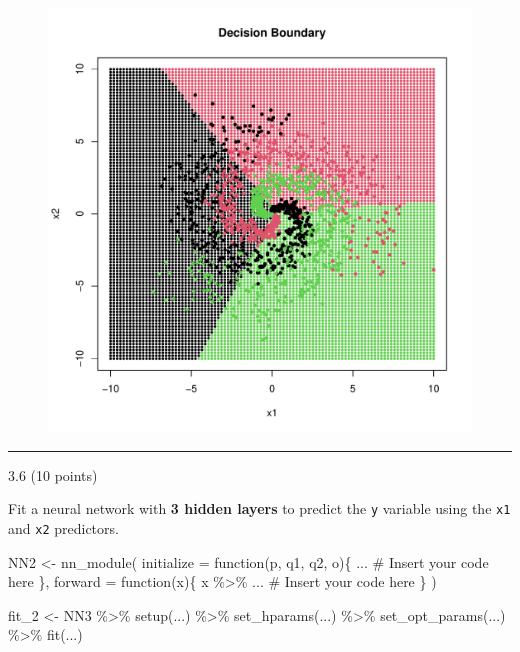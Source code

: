 \documentclass[
  letterpaper,
  DIV=11,
  numbers=noendperiod]{scrartcl}
\newenvironment{Shaded}{\begin{snugshade}}{\end{snugshade}}
\newcommand{\AttributeTok}[1]{\textcolor[rgb]{0.40,0.45,0.13}{#1}}
\newcommand{\CommentTok}[1]{\textcolor[rgb]{0.37,0.37,0.37}{#1}}
\newcommand{\ControlFlowTok}[1]{\textcolor[rgb]{0.00,0.23,0.31}{#1}}
\newcommand{\FunctionTok}[1]{\textcolor[rgb]{0.28,0.35,0.67}{#1}}
\newcommand{\NormalTok}[1]{\textcolor[rgb]{0.00,0.23,0.31}{#1}}
\newcommand{\OtherTok}[1]{\textcolor[rgb]{0.00,0.23,0.31}{#1}}
\newcommand{\SpecialCharTok}[1]{\textcolor[rgb]{0.37,0.37,0.37}{#1}}
\begin{document}
\begin{figure}[H]

{\centering \includegraphics{hw5_files/figure-pdf/unnamed-chunk-34-2.pdf}

}

\end{figure}

\begin{center}\rule{0.5\linewidth}{0.5pt}\end{center}

3.6 (10 points)

Fit a neural network with \textbf{3 hidden layers} to predict the
\texttt{y} variable using the \texttt{x1} and \texttt{x2} predictors.

\begin{Shaded}
\begin{Highlighting}[]
\NormalTok{NN2 }\OtherTok{\textless{}{-}} \FunctionTok{nn\_module}\NormalTok{(}
  \AttributeTok{initialize =} \ControlFlowTok{function}\NormalTok{(p, q1, q2, o)\{}
\NormalTok{    ... }\CommentTok{\# Insert your code here}
\NormalTok{  \},}
  \AttributeTok{forward =} \ControlFlowTok{function}\NormalTok{(x)\{}
\NormalTok{    x }\SpecialCharTok{\%\textgreater{}\%} 
\NormalTok{    ... }\CommentTok{\# Insert your code here}
\NormalTok{  \}}
\NormalTok{)}

\NormalTok{fit\_2 }\OtherTok{\textless{}{-}}\NormalTok{ NN3 }\SpecialCharTok{\%\textgreater{}\%} 
  \FunctionTok{setup}\NormalTok{(...) }\SpecialCharTok{\%\textgreater{}\%}
  \FunctionTok{set\_hparams}\NormalTok{(...) }\SpecialCharTok{\%\textgreater{}\%}
  \FunctionTok{set\_opt\_params}\NormalTok{(...) }\SpecialCharTok{\%\textgreater{}\%}
  \FunctionTok{fit}\NormalTok{(...)}
\end{Highlighting}
\end{Shaded}
\end{document}
